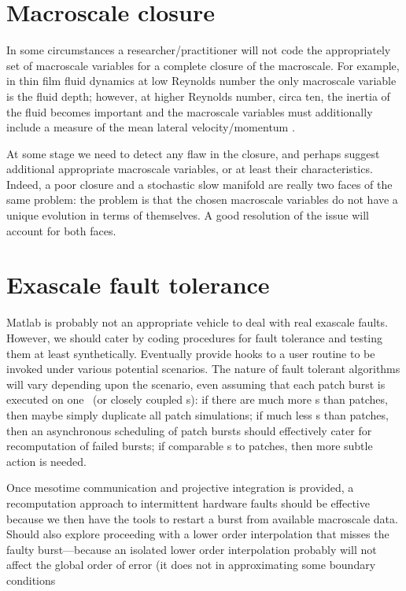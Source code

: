 \section{Macroscale closure}

In some circumstances a researcher\slash practitioner will not code the appropriately set of macroscale variables for a complete closure of the macroscale.
For example, in thin film fluid dynamics at low Reynolds number the only macroscale variable is the fluid depth; however, at higher Reynolds number, circa ten, the inertia of the fluid becomes important and the macroscale variables must additionally include a measure of the mean lateral velocity\slash momentum \citep[e.g.]{Roberts99b}.

At some stage we need to detect any flaw in the closure, and perhaps suggest additional appropriate macroscale variables, or at least their characteristics.
Indeed, a poor closure and a stochastic slow manifold are really two faces of the same problem: the problem is that the chosen macroscale variables do not have a unique evolution in terms of themselves. 
A good resolution of the issue will account for both faces.




\section{Exascale fault tolerance}

Matlab is probably not an appropriate vehicle to deal with real exascale faults.  
However, we should cater by coding procedures for fault tolerance and testing them at least synthetically.
Eventually provide hooks to a user routine to be invoked under various potential scenarios.
The nature of fault tolerant algorithms will vary depending upon the scenario, even assuming that each patch burst is executed on one \cpu\ (or closely coupled \cpu{}s): if there are much more \cpu{}s than patches, then maybe simply duplicate all patch simulations;  if much less \cpu{}s than patches, then an asynchronous scheduling of patch bursts should effectively cater for recomputation of failed bursts; if comparable \cpu{}s to patches, then more subtle action is needed.

Once mesotime communication and projective integration is provided, a recomputation approach to intermittent hardware faults should be effective because we then have the tools to restart a burst from available macroscale data.
Should also explore proceeding with a lower order interpolation that misses the faulty burst---because an isolated lower order interpolation probably will not affect the global order of error (it does not in approximating some boundary conditions \citep{Gustafsson1975, Svard2006}




